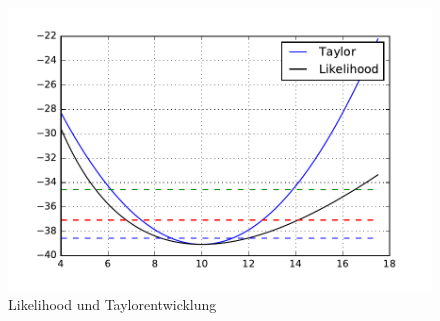 \begin{figure}
  \centering
  \includegraphics[width=\textwidth]{./Python/TaskA.pdf}
  \caption{Likelihood und Taylorentwicklung}
\end{figure}
